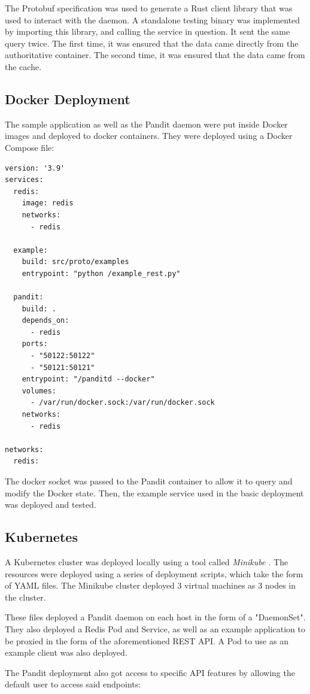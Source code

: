 \documentclass[a4paper,12pt]{report}
\begin{document}
The Protobuf specification was used to generate a Rust client library \cite{codegen} that was used to interact with the daemon.
A standalone testing binary was implemented by importing this library, and calling the service in question.
It sent the same query twice. The first time, it was ensured that the data came directly from the authoritative container. The second time, it was
ensured that the data came from the cache.

\subsection{Docker Deployment}
The sample application as well as the Pandit daemon were put inside Docker images and deployed to docker containers. 
They were deployed using a Docker Compose \cite{compose} file:
\begin{lstlisting}
version: '3.9'
services:
  redis:
    image: redis
    networks:
      - redis

  example:
    build: src/proto/examples
    entrypoint: "python /example_rest.py"

  pandit:
    build: .
    depends_on:
      - redis
    ports:
      - "50122:50122"
      - "50121:50121"
    entrypoint: "/panditd --docker"
    volumes:
      - /var/run/docker.sock:/var/run/docker.sock
    networks:
      - redis

networks:
  redis:
\end{lstlisting}

The docker socket was passed to the Pandit container to allow it to query and modify the Docker state.
Then, the example service used in the basic deployment was deployed and tested.

\subsection{Kubernetes}
A Kubernetes cluster was deployed locally using a tool called \textit{Minikube \cite{kube}}. 
The resources were deployed using a series of deployment scripts, which take the form of YAML files.
The Minikube cluster deployed 3 virtual machines as 3 nodes in the cluster.

These files deployed a Pandit daemon on each host in the form of a "DaemonSet".
They also deployed a Redis Pod and Service, as well as an example application to be proxied in the form of the aforementioned REST API.
A Pod to use as an example client was also deployed.

The Pandit deployment also got access to specific API features by allowing the default user to access said endpoints:
\end{document}
